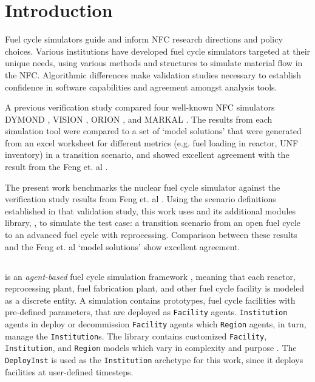 
\section{Introduction}
Fuel cycle simulators guide and inform \gls{NFC} research directions and policy choices.
Various institutions have developed fuel cycle simulators targeted at their unique needs,
using various methods and structures
to simulate material flow in the \gls{NFC}.
Algorithmic differences make
validation studies necessary to establish
confidence in software capabilities and
agreement amongst analysis tools.

A previous verification study \cite{feng_standardized_2016} compared
four well-known \gls{NFC} simulators
DYMOND \cite{yacout_modeling_2005},
VISION \cite{jacobson_verifiable_2010},
ORION \cite{gregg_analysis_2012}, and
MARKAL \cite{shay_epa_2006}. The results from each simulation tool
were compared to a set of `model solutions' that were generated
from an excel worksheet for different metrics (e.g. fuel loading in reactor,
\gls{UNF} inventory) in a transition scenario, and showed excellent agreement
with the result from the Feng et. al \cite{feng_standardized_2016}.

The present work benchmarks the \Cyclus nuclear fuel cycle simulator 
\cite{huff_fundamental_2016}
against the verification study results from Feng et. al 
\cite{feng_standardized_2016}.
Using the scenario definitions established in that validation study,
this work uses \Cyclus and its additional modules library, \Cycamore, to simulate the test case: a transition scenario from an
open fuel cycle to an advanced fuel cycle with
reprocessing. Comparison between these results and the Feng et. al `model solutions'
show excellent agreement.


\subsection{\Cyclus}

\Cyclus is an \emph{agent-based} fuel cycle simulation framework 
\cite{huff_fundamental_2016}, meaning 
that each reactor, reprocessing plant, fuel fabrication plant, and other fuel cycle
facility is modeled as a discrete entity.
A \Cyclus simulation contains prototypes, fuel cycle facilities with
pre-defined parameters, that are deployed as \texttt{Facility} agents.
\texttt{Institution} agents in \Cyclus deploy or decommission \texttt{Facility} 
agents which \texttt{Region} agents, in turn, manage the \texttt{Institution}s.
The \Cycamore library contains customized \texttt{Facility}, 
\texttt{Institution}, and \texttt{Region} models which vary in complexity and purpose \cite{huff_extensions_2014}.
The \Cycamore \texttt{DeployInst} is used as the \texttt{Institution} archetype for this 
 work, since it deploys facilities at user-defined timesteps.
